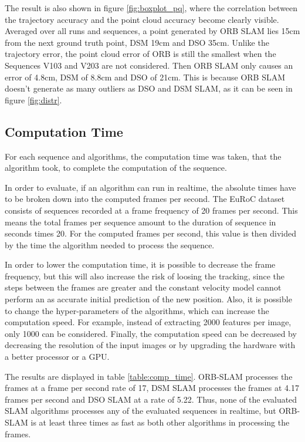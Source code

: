 	The result is also shown in figure \ref{fig:boxplot_pq}, where the correlation between the trajectory accuracy and the point cloud accuracy become clearly 
	visible. Averaged over all runs and sequences, a point generated by ORB SLAM lies 15cm from the next ground truth point, DSM 19cm and DSO 35cm. 
	Unlike the trajectory error, the point cloud error of ORB is still the smallest when the Sequences V103 and V203 are not considered. Then ORB SLAM 
	only causes an error of 4.8cm, DSM of 8.8cm and DSO of 21cm. This is because ORB SLAM doesn't generate as many outliers as DSO and DSM SLAM, as it can be seen 
	in figure \ref{fig:distr}.
	
	
	

\subsection{Computation Time}

	For each sequence and algorithms, the computation time was taken, that the algorithm took, to complete the computation of the sequence. 
	
	In order to evaluate, if an algorithm can run in realtime, the absolute times have to be broken down into the computed frames per second.
	The EuRoC dataset consists of sequences recorded at a frame frequency of 20 frames per second. This means the total frames per sequence 
	amount to the duration of sequence in seconds times 20. For the computed frames per second, this value is then divided by the time the algorithm needed 
	to process the sequence. 
	
	In order to lower the computation time, it is possible to decrease the frame 
	frequency, but this will also increase the risk of loosing the tracking, since the steps between the frames are greater and 
	the constant velocity model cannot perform an as accurate initial  prediction of the new position. Also, it is possible to change the hyper-parameters of 
	the algorithms, which can increase the computation speed. For example, instead of extracting 2000 features per image, 
	only 1000 can be considered. Finally, the computation speed can be decreased by decreasing the resolution of the input images 
	or by upgrading the hardware with a better processor or a GPU. 
	
	The results are displayed in table \ref{table:comp_time}. ORB-SLAM processes the frames at a frame per second rate of 17, 
	DSM SLAM processes the frames at 4.17 frames per second and DSO SLAM at a rate of 5.22. Thus, 
	none of the evaluated SLAM algorithms processes any of the evaluated sequences in realtime, but ORB-SLAM is at least 
	three times as fast as both other algorithms in processing the frames. 
	
